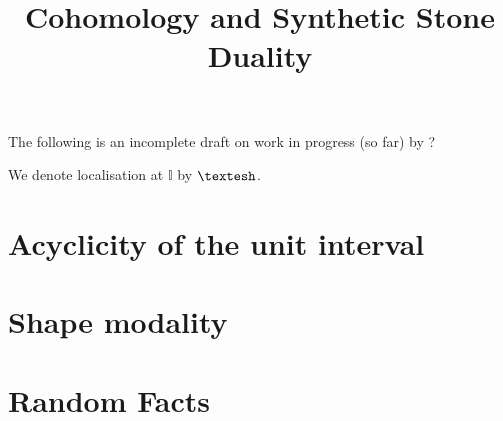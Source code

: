 \documentclass{../util/zariski}
\title{Cohomology and Synthetic Stone Duality}
\begin{document}
\maketitle

The following is an incomplete draft on work in progress (so far)
by ?

We denote localisation at $\mathbb{I}$ by $\shape$.

\tableofcontents

\section{Acyclicity of the unit interval}


\section{Shape modality}


\section{Random Facts}


\printindex

\printbibliography
\end{document}
